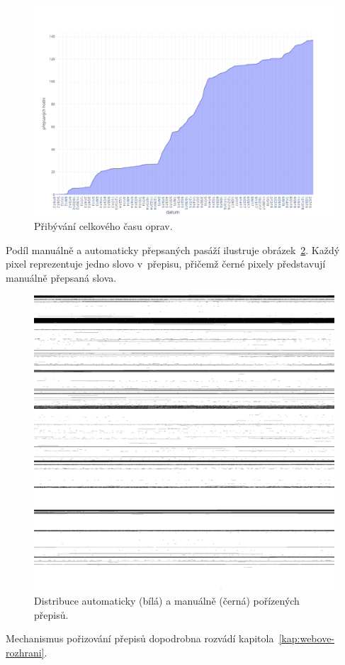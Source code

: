 \begin{figure}[htpb]
\includegraphics[scale=0.39]{rc/corpus-growth.png}
\caption{Přibývání celkového času oprav.}
\label{fig:corpus-growth}
\end{figure}

Podíl manuálně a automaticky přepsaných pasáží ilustruje
obrázek~\ref{fig:humbits}. Každý pixel reprezentuje jedno slovo v~přepisu,
přičemž černé pixely představují manuálně přepsaná slova.

\begin{figure}[htpb]
\includegraphics[scale=0.137]{rc/humbits.png}
\caption{Distribuce automaticky (bílá) a manuálně (černá) pořízených přepisů.}
\label{fig:humbits}
\end{figure}

Mechanismus pořizování přepisů dopodrobna rozvádí kapitola~\ref{kap:webove-rozhrani}. 
